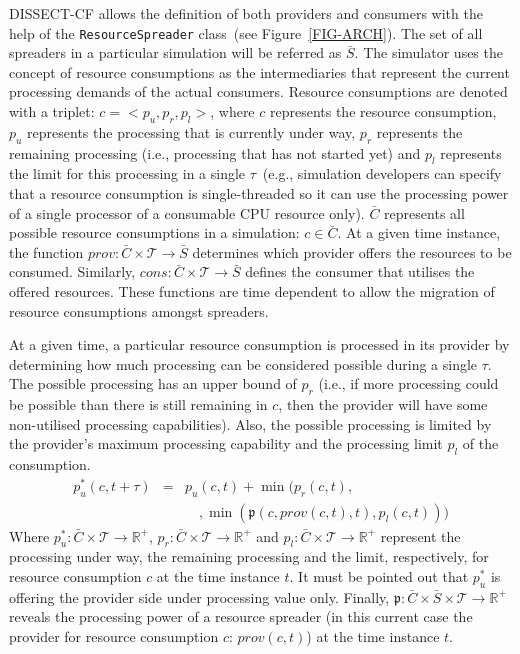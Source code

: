 \documentclass[sort, compress, 5p]{elsarticle}
\newcommand{\SMALLESTIMEGRANULARITYM}{\tau}
\newcommand{\SMALLESTIMEGRANULARITY}{$\SMALLESTIMEGRANULARITYM$}
\newcommand{\SIMULATIONTIMEM}{\mathcal{T}}
\begin{document}
DISSECT-CF allows the definition of both providers and consumers with the help of the \verb+ResourceSpreader+ class~(see Figure~\ref{FIG-ARCH}). The set of all spreaders in a particular simulation will be referred as $\bar{S}$. The simulator uses the concept of resource consumptions as the intermediaries that represent the current processing demands of the actual consumers. Resource consumptions are denoted with a triplet: $c = <p_u,p_r,p_l>$, where $c$ represents the resource consumption, $p_u$ represents the processing that is currently under way, $p_r$ represents the remaining processing (i.e., processing that has not started yet) and $p_l$ represents the limit for this processing in a single \SMALLESTIMEGRANULARITY~(e.g., simulation developers can specify that a resource consumption is single-threaded so it can use the processing power of a single processor of a consumable CPU resource only). $\bar{C}$ represents all possible resource consumptions in a simulation: $c\in\bar{C}$. At a given time instance, the function $prov: \bar{C} \times \SIMULATIONTIMEM \to \bar{S}$ determines which provider offers the resources to be consumed. Similarly, $cons: \bar{C} \times \SIMULATIONTIMEM \to \bar{S}$ defines the consumer that utilises the offered resources. These functions are time dependent to allow the migration of resource consumptions  amongst spreaders.

At a given time, a particular resource consumption is processed in its provider by determining how much processing can be considered possible during a single \SMALLESTIMEGRANULARITY. The possible processing has an upper bound of $p_r$ (i.e., if more processing could be possible than there is still remaining in $c$, then the provider will have some non-utilised processing capabilities). Also, the possible processing is limited by the provider's maximum processing capability and the processing limit $p_l$ of the consumption.
\begin{eqnarray}
p_u^*(c,t+\SMALLESTIMEGRANULARITYM)&=&p_u(c,t)+\min\big(p_r(c,t),\\
&&\quad,\min(\mathfrak{p}(c, prov(c,t),t),p_l(c,t))\big) \label{EQ-PROV-UPDATE}\nonumber
\end{eqnarray}
Where $p_u^*: \bar{C} \times \SIMULATIONTIMEM \to \mathbb{R}^+$, $p_r: \bar{C} \times \SIMULATIONTIMEM \to \mathbb{R}^+$ and $p_l: \bar{C} \times \SIMULATIONTIMEM \to \mathbb{R}^+$ represent the processing under way, the remaining processing and the limit, respectively, for resource consumption $c$ at the time instance $t$. It must be pointed out that $p_u^*$ is offering the provider side under processing value only. Finally, $\mathfrak{p}: \bar{C} \times \bar{S} \times \SIMULATIONTIMEM \to \mathbb{R}^+$ reveals the processing power of a resource spreader (in this current case the provider for resource consumption $c$: $prov(c,t)$) at the time instance $t$. 
\end{document}

